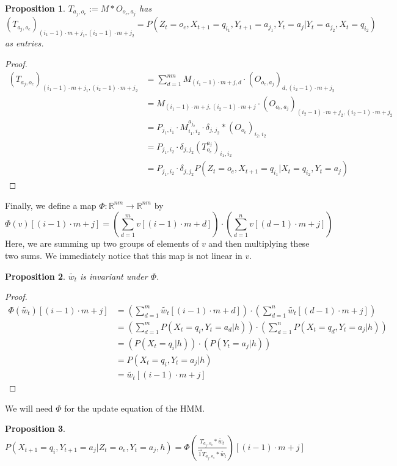 \documentclass{article}
\newtheorem{prop}{Proposition}
\theoremstyle{definition}
\begin{document}
\begin{prop} $T_{a_j,o_e}:=M*O_{o_e,a_j}$ has $(T_{a_j,o_e})_{(i_1-1) \cdot m+j_1,(i_2-1) \cdot m+j_2}=P(Z_t=o_e,X_{t+1}=q_{i_1},Y_{t+1}=a_{j_1},Y_t=a_j|Y_t=a_{j_2},X_t=q_{i_2})$ as entries. \end{prop}
\begin{proof}
\begin{align*}
(T_{a_j,o_e})_{(i_1-1) \cdot m+j_1,(i_2-1) \cdot m+j_2}&=\sum\limits_{d=1}^{nm} M_{(i_1-1) \cdot m+j,d}\cdot (O_{o_e,a_j})_{d,(i_2-1) \cdot m+j_2} \\
&= M_{(i_1-1) \cdot m+j,(i_2-1) \cdot m+j}\cdot (O_{o_e,a_j})_{(i_2-1) \cdot m+j_2,(i_2-1) \cdot m+j_2} \\
&=P_{j_1,i_1}\cdot M^{a_{j_2}}_{i_1,i_2}\cdot \delta_{j,j_2}*(O_{o_e})_{i_2,i_2} \\
&=P_{j_1,i_2}\cdot \delta_{j,j_2} (T^{a_j}_{o_e})_{i_1,i_2} \\
&=P_{j_1,i_2}\cdot \delta_{j,j_2} P(Z_t=o_e,X_{t+1}=q_{i_1}|X_t=q_{i_2},Y_t=a_j)
\end{align*}
\end{proof}
Finally, we define a map $\Phi:\mathbb{R}^{nm} \rightarrow \mathbb{R}^{nm}$ by 
\[\Phi(v)[(i-1) \cdot m+j]=(\sum\limits_{d=1}^{m} v[(i-1) \cdot m+d])\cdot (\sum\limits_{d=1}^{n} v[(d-1) \cdot m+j])
\]
Here, we are summing up two groups of elements of $v$ and then multiplying these two sums. We immediately notice that this map is not linear in $v$.
\begin{prop}$\widetilde{w_t}$ is invariant under $\Phi$.
\end{prop}
\begin{proof}
\begin{align*}
\Phi(\widetilde{w_t})[(i-1) \cdot m+j]&=(\sum\limits_{d=1}^{m} \widetilde{w_t}[(i-1) \cdot m+d])\cdot (\sum\limits_{d=1}^{n} \widetilde{w_t}[(d-1) \cdot m+j]) \\
&=(\sum\limits_{d=1}^{m} P(X_t=q_i,Y_t=a_d|h))\cdot (\sum\limits_{d=1}^{n} P(X_t=q_d,Y_t=a_j|h)) \\
&=(P(X_t=q_i|h))\cdot (P(Y_t=a_j|h)) \\
&=P(X_t=q_i,Y_t=a_j|h) \\
&=\widetilde{w_t}[(i-1) \cdot m+j]
\end{align*}
\end{proof}
We will need $\Phi$ for the update equation of the HMM.
\begin{prop}
$P(X_{t+1}=q_i,Y_{t+1}=a_j|Z_t=o_e,Y_t=a_j,h)=\Phi \left ( \frac{T_{a_j,o_e}*\widetilde{w_t}}{\vec{1}T_{a_j,o_e}*\widetilde{w_t}} \right )[(i-1)\cdot m+j] $
\end{prop}
\end{document}
